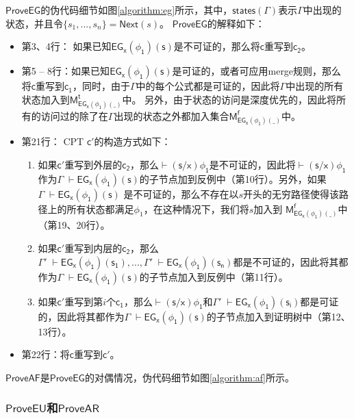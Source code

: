 $\mathsf{ProveEG}$的伪代码细节如图\ref{algorithm:eg}所示，其中，$\mathsf{states(\Gamma)}$表示$\mathsf{\Gamma}$中出现的状态，并且令$\{s_1,...,s_n\}=\textsf{Next}(s)$。
$\mathsf{ProveEG}$的解释如下：
\begin{itemize}
	\item 第3、4行： 如果已知$\mathsf{EG_x(\phi_1)(s)}$是不可证的，那么将$\mathsf{c}$重写到$\mathsf{c_2}$。
	\item 第5 -- 8行：如果已知$\mathsf{EG_x(\phi_1)(s)}$是可证的，或者可应用merge规则，那么将$\mathsf{c}$重写到$\mathsf{c_1}$，同时，由于${\Gamma}$中的每个公式都是可证的，因此将${\Gamma}$中出现的所有状态加入到$\mathsf{M_{EG_x(\phi_1)(\_)}^t}$中。
	另外，由于状态的访问是深度优先的，因此将所有的访问过的除了在${\Gamma}$出现的状态之外都加入集合$\mathsf{M_{EG_x(\phi_1)(\_)}^f}$中。
	\item 第21行： \textsf{CPT} $\mathsf{c'}$的构造方式如下：
	\begin{enumerate}
		\item 如果$\mathsf{c'}$重写到外层的$\mathsf{c_2}$，那么$\mathsf{\vdash(s/x)\phi_1}$是不可证的，因此将$\mathsf{\vdash(s/x)\phi_1}$作为$\Gamma\;\mathsf{\vdash EG_x(\phi_1)(s)}$的子节点加到反例中（第10行）。另外，如果 $\Gamma\;\mathsf{\vdash EG_x(\phi_1)(s)}$ 是不可证的，那么不存在以$s$开头的无穷路径使得该路径上的所有状态都满足$\phi_1$，在这种情况下，我们将$s$加入到 $\mathsf{M_{EG_x(\phi_1)(\_)}^f}$中（第19、20行）。
		
		\item 如果$\mathsf{c'}$重写到内层的$\mathsf{c_2}$，那么$\Gamma'\;\mathsf{\vdash EG_x(\phi_1)(s_1)}, ... , \Gamma'\;\mathsf{\vdash EG_x(\phi_1)(s_n)}$都是不可证的，因此将其都作为$\Gamma\;\mathsf{\vdash EG_x(\phi_1)(s)}$的子节点加入到反例中（第11行）。
		\item 如果$\mathsf{c'}$重写到第$i$个$\mathsf{c_1}$，那么$\mathsf{\vdash(s/x)\phi_1}$和$\Gamma'\;\mathsf{\vdash EG_x(\phi_1)(s_i)}$都是可证的，因此将其都作为$\Gamma\;\mathsf{\vdash EG_x(\phi_1)(s)}$的子节点加入到证明树中（第12、13行）。 
	\end{enumerate}
	\item 第22行：将$\mathsf{c}$重写到$\mathsf{c'}$。
\end{itemize}


$\mathsf{ProveAF}$是$\mathsf{ProveEG}$的对偶情况，伪代码细节如图\ref{algorithm:af}所示。


\subsubsection{$\mathsf{ProveEU}$和$\mathsf{ProveAR}$}


